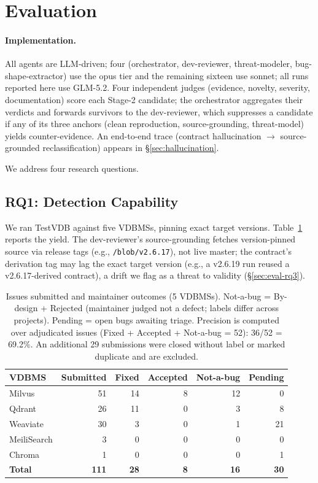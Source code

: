 \documentclass[sigconf, anonymous, review]{acmart}
\begin{document}
\section{Evaluation}\label{sec:eval}

\paragraph{Implementation.} All agents are LLM-driven; four (orchestrator, dev-reviewer, threat-modeler, bug-shape-extractor) use the opus tier and the remaining sixteen use sonnet; all runs reported here use GLM-5.2. Four independent judges (evidence, novelty, severity, documentation) score each Stage-2 candidate; the orchestrator aggregates their verdicts and forwards survivors to the dev-reviewer, which suppresses a candidate if any of its three anchors (clean reproduction, source-grounding, threat-model) yields counter-evidence. An end-to-end trace (contract hallucination $\to$ source-grounded reclassification) appears in \S\ref{sec:hallucination}.

We address four research questions.

\subsection{RQ1: Detection Capability}
We ran TestVDB against five VDBMSs, pinning exact target versions. Table~\ref{tab:yield} reports the yield. The dev-reviewer's source-grounding fetches version-pinned source via release tags (e.g., \texttt{/blob/v2.6.17}), not live master; the contract's derivation tag may lag the exact target version (e.g., a v2.6.19 run reused a v2.6.17-derived contract), a drift we flag as a threat to validity (\S\ref{sec:eval-rq3}).

\begin{table}[t]
\caption{Issues submitted and maintainer outcomes (5 VDBMSs). Not-a-bug = By-design + Rejected (maintainer judged not a defect; labels differ across projects). Pending = open bugs awaiting triage. Precision is computed over adjudicated issues (Fixed + Accepted + Not-a-bug = 52): 36/52 = 69.2\%. An additional 29 submissions were closed without label or marked duplicate and are excluded.}
\label{tab:yield}
\small
\begin{tabular}{lrrrrr}
\toprule
VDBMS & Submitted & Fixed & Accepted & Not-a-bug & Pending \\
\midrule
Milvus      & 51 & 14 & 8 & 12 & 0 \\
Qdrant      & 26 & 11 & 0 & 3  & 8 \\
Weaviate    & 30 & 3  & 0 & 1  & 21 \\
MeiliSearch & 3  & 0  & 0 & 0  & 0 \\
Chroma      & 1  & 0  & 0 & 0  & 1 \\
\midrule
\textbf{Total} & \textbf{111} & \textbf{28} & \textbf{8} & \textbf{16} & \textbf{30} \\
\bottomrule
\end{tabular}
\end{table}
\end{document}

